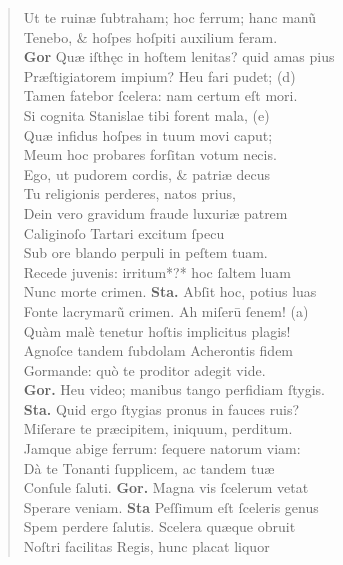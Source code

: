 \documentclass[a4paper,12pt]{article}
\begin{document}
\begin{verse}
Ut te ruinæ ſubtraham; hoc ferrum; hanc manũ\\[0pt]
Tenebo, \& hoſpes hoſpiti auxilium feram.\\[0pt]
\textbf{Gor} Quæ iſthęc in hoſtem lenitas? quid amas pius\\[0pt]
Præſtigiatorem impium? Heu fari pudet; (d)\footnotemark\\[0pt]
Tamen fatebor ſcelera: nam certum eſt mori.\\[0pt]
Si cognita Stanislae tibi forent mala, (e)\footnotemark\\[0pt]
Quæ infidus hoſpes in tuum movi caput;\\[0pt]
Meum hoc probares forſitan votum necis.\\[0pt]
Ego, ut pudorem cordis, \& patriæ decus\\[0pt]
Tu religionis perderes, natos prius,\\[0pt]
Dein vero gravidum fraude luxuriæ patrem\\[0pt]
Caliginoſo Tartari excitum ſpecu\\[0pt]
Sub ore blando perpuli in peſtem tuam.\\[0pt]
Recede juvenis: irritum*?* hoc ſaltem luam\\[0pt]
Nunc morte crimen. \textbf{Sta.} Abſit hoc, potius luas\\[0pt]
Fonte lacrymarũ crimen. Ah miſerū ſenem! (a)\footnotemark\\[0pt]
Quàm malè tenetur hoſtis implicitus plagis!\\[0pt]
Agnoſce tandem ſubdolam Acherontis fidem\\[0pt]
Gormande: quò te proditor adegit vide.\\[0pt]
\textbf{Gor.} Heu video; manibus tango perfidiam ſtygis.\\[0pt]
\textbf{Sta.} Quid ergo ſtygias pronus in fauces ruis?\\[0pt]
Miſerare te præcipitem, iniquum, perditum.\\[0pt]
Jamque abige ferrum: ſequere natorum viam:\\[0pt]
Dà te Tonanti ſupplicem, ac tandem tuæ\\[0pt]
Conſule ſaluti. \textbf{Gor.} Magna vis ſcelerum vetat\\[0pt]
Sperare veniam. \textbf{Sta} Peſſimum eſt ſceleris genus\\[0pt]
Spem perdere ſalutis. Scelera quæque obruit\\[0pt]
Noſtri facilitas Regis, hunc placat liquor\\[0pt]

\end{verse}
\end{document}
